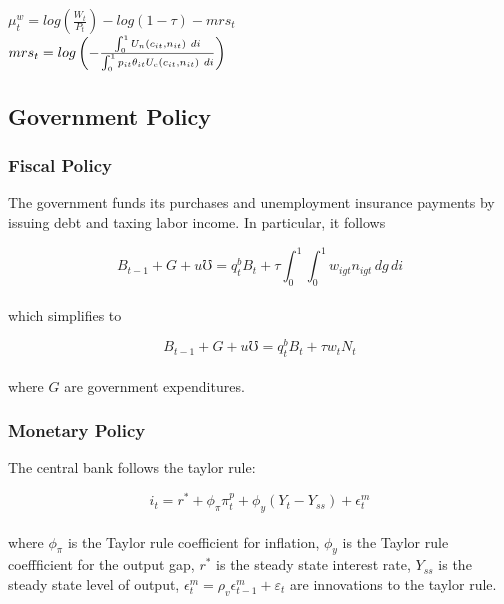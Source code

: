 \documentclass[titlepage]{\econtex}\providecommand{\texname}{FBS-NK}
\begin{document}
$\mu_{t}^{w} = log\left( \frac{W_{t}}{P_{t}}\right)  - log\left(1 -\tau \right) - mrs_{t}$ \\


$ mrs_{t} = log \left(- \frac{\int_{0}^{1}   U_{n} \left(c_{i t}, n_{i t} \right) \ d i  }{\int_{0}^{1}  p_{it} \theta_{it} U_{c} \left(c_{i t}, n_{i t} \right) \  di } \right) \\ \\ $


\hypertarget{Government Policy}{}
\subsection{Government Policy}



\hypertarget{Fiscal Policy}{}
\subsubsection{Fiscal Policy}

The government funds its purchases and unemployment insurance payments by issuing debt and taxing labor income. In particular, it follows 

$$ B_{t-1} + G + \mathit{u} \mho =   q^{b}_{t} B_{t} +  \tau \int_{0}^{1} \int_{0}^{1} w_{igt} n_{igt} \, dg \, di$$ \\

which simplifies to 

$$ B_{t-1} + G + \mathit{u} \mho =   q^{b}_{t} B_{t} +  \tau w_{t}N_{t}$$  \\


where $G $ are government expenditures. \\



\hypertarget{Monetary Policy}{}
\subsubsection{Monetary Policy}


The central bank follows the taylor rule: 

$$i_{t} = r^{*} +\phi_{\pi} \pi^{p}_{t} + \phi_{y} (Y_{t} - Y_{ss}) + \epsilon^{m}_{t}$$ \\

where $\phi_{\pi}$ is the Taylor rule coefficient for inflation, $\phi_{y}$ is the Taylor rule coeffficient for the output gap,  $r^{*}$ is the steady state interest rate, $Y_{ss}$ is the steady state level of output,  $\epsilon^{m}_{t} = \rho_{v} \epsilon^{m}_{t-1} +\varepsilon_{t}$ are innovations to the taylor rule. \\
\end{document}
